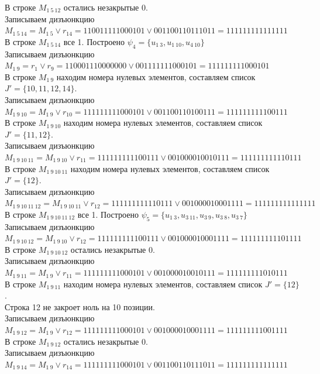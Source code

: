 \documentclass[a4paper,12pt]{article}
\begin{document}
В строке $M_{1\ 5\ 12}$ остались незакрытые 0.\\
Записываем дизъюнкцию $M_{1\ 5\ 14} = M_{1\ 5}\lor r_{14} = 110011111000101 \lor 001100110111011 = 111111111111111$\\
В строке $M_{1\ 5\ 14}$ все 1. Построено $\psi_{4} = \{u_{1\ 3},u_{1\ 10},u_{4\ 10}\}$\\
Записываем дизъюнкцию $M_{1\ 9} = r_{1}\lor r_{9} = 110001110000000 \lor 001111111000101 = 111111111000101$\\
В строке $M_{1\ 9}$ находим номера нулевых элементов, составляем список $J' = \{10, 11, 12, 14\}$.\\
Записываем дизъюнкцию $M_{1\ 9\ 10} = M_{1\ 9}\lor r_{10} = 111111111000101 \lor 001100110100111 = 111111111100111$\\
В строке $M_{1\ 9\ 10}$ находим номера нулевых элементов, составляем список $J' = \{11, 12\}$.\\
Записываем дизъюнкцию $M_{1\ 9\ 10\ 11} = M_{1\ 9\ 10}\lor r_{11} = 111111111100111 \lor 001000010010111 = 111111111110111$\\
В строке $M_{1\ 9\ 10\ 11}$ находим номера нулевых элементов, составляем список $J' = \{12\}$.\\
Записываем дизъюнкцию $M_{1\ 9\ 10\ 11\ 12} = M_{1\ 9\ 10\ 11}\lor r_{12} = 111111111110111 \lor 001000010001111 = 111111111111111$\\
В строке $M_{1\ 9\ 10\ 11\ 12}$ все 1. Построено $\psi_{5} = \{u_{1\ 3},u_{3\ 11},u_{3\ 9},u_{3\ 8},u_{3\ 7}\}$\\
Записываем дизъюнкцию $M_{1\ 9\ 10\ 12} = M_{1\ 9\ 10}\lor r_{12} = 111111111100111 \lor 001000010001111 = 111111111101111$\\
В строке $M_{1\ 9\ 10\ 12}$ остались незакрытые 0.\\
Записываем дизъюнкцию $M_{1\ 9\ 11} = M_{1\ 9}\lor r_{11} = 111111111000101 \lor 001000010010111 = 111111111010111$\\
В строке $M_{1\ 9\ 11}$ находим номера нулевых элементов, составляем список $J' = \{12\}$.\\
Строка 12 не закроет ноль на 10 позиции.\\
Записываем дизъюнкцию $M_{1\ 9\ 12} = M_{1\ 9}\lor r_{12} = 111111111000101 \lor 001000010001111 = 111111111001111$\\
В строке $M_{1\ 9\ 12}$ остались незакрытые 0.\\
Записываем дизъюнкцию $M_{1\ 9\ 14} = M_{1\ 9}\lor r_{14} = 111111111000101 \lor 001100110111011 = 111111111111111$\\
\end{document}
